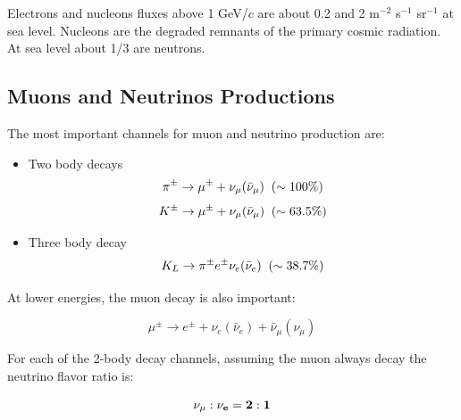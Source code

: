 \documentclass[
  letterpaper,
  DIV=11,
  numbers=noendperiod]{scrreprt}
\begin{document}
Electrons and nucleons fluxes above 1 GeV/\(c\) are about 0.2 and 2
m\(^{-2}\) s\(^{-1}\) sr\(^{-1}\) at sea level. Nucleons are the
degraded remnants of the primary cosmic radiation. At sea level about
1/3 are neutrons.

\subsection{Muons and Neutrinos
Productions}\label{muons-and-neutrinos-productions}

The most important channels for muon and neutrino production are:

\begin{itemize}
\item
  Two body decays
  \[\pi^{\pm} \rightarrow \mu^{\pm} + \nu_{\mu}({ \bar \nu_\mu}) \rm{\;\; (\sim 100\%)}\]
  \[K^{\pm} \rightarrow \mu^{\pm} + \nu_{\mu}({\bar \nu_\mu}) \rm{\;\; (\sim 63.5\%)}\]
\item
  Three body decay
  \[K_L \rightarrow \pi^{\pm} e^{\pm}\nu_e({\bar \nu_e}) \rm{\;\; (\sim 38.7\%)}\]
\end{itemize}

At lower energies, the muon decay is also important:

\[ \mu^{\pm} \rightarrow e^{\pm} + \nu_{e}({\bar \nu_e}) + {\bar \nu_{\mu}}(\nu_\mu)\]

For each of the 2-body decay channels, assuming the muon always decay
the neutrino flavor ratio is:

\[\bf{ \nu_\mu : \nu_e = 2:1}\]
\end{document}
